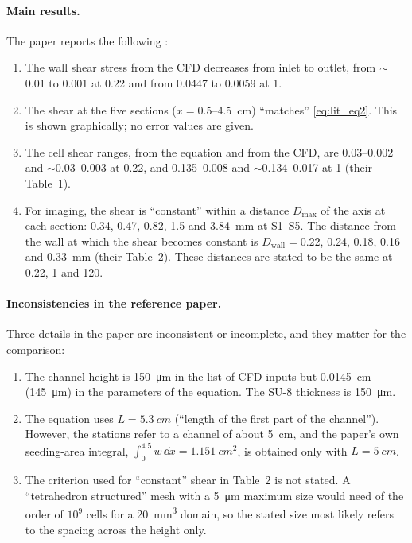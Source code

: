 \paragraph{Main results.} The paper reports the following \tagP:
\begin{enumerate}
\item The wall shear stress from the CFD decreases from inlet to outlet, from $\sim$\SI{0.01}{\dyncm} to \SI{0.001}{\dyncm} at \SI{0.22}{\uLmin} and from \SI{0.0447}{\dyncm} to \SI{0.0059}{\dyncm} at \SI{1}{\uLmin}.
\item The shear at the five sections ($x=0.5$--\SI{4.5}{cm}) ``matches'' \cref{eq:lit_eq2}. This is shown graphically; no error values are given.
\item The cell shear ranges, from the equation and from the CFD, are \SIrange{0.03}{0.002}{\dyncm} and $\sim$\SIrange{0.03}{0.003}{\dyncm} at \SI{0.22}{\uLmin}, and \SIrange{0.135}{0.008}{\dyncm} and $\sim$\SIrange{0.134}{0.017}{\dyncm} at \SI{1}{\uLmin} (their Table~1).
\item For imaging, the shear is ``constant'' within a distance $D_{\max}$ of the axis at each section: 0.34, 0.47, 0.82, 1.5 and \SI{3.84}{mm} at S1--S5. The distance from the wall at which the shear becomes constant is $D_{\mathrm{wall}}=0.22$, 0.24, 0.18, 0.16 and \SI{0.33}{mm} (their Table~2). These distances are stated to be the same at 0.22, 1 and \SI{120}{\uLmin}.
\end{enumerate}

\paragraph{Inconsistencies in the reference paper.} Three details in the paper are inconsistent or incomplete, and they matter for the comparison:
\begin{enumerate}[label=(\roman*)]
\item The channel height is \SI{150}{\micro\metre} in the list of CFD inputs but \SI{0.0145}{cm} (\SI{145}{\micro\metre}) in the parameters of the equation. The SU-8 thickness is \SI{150}{\micro\metre}.
\item The equation uses $L=\SI{5.3}{cm}$ (``length of the first part of the channel''). However, the stations refer to a channel of about \SI{5}{cm}, and the paper's own seeding-area integral, $\int_0^{4.5}w\,\dd x=\SI{1.151}{cm^2}$, is obtained only with $L=\SI{5}{cm}$.
\item The criterion used for ``constant'' shear in Table~2 is not stated. A ``tetrahedron structured'' mesh with a \SI{5}{\micro\metre} maximum size would need of the order of $10^9$ cells for a \SI{20}{\milli\metre\cubed} domain, so the stated size most likely refers to the spacing across the height only.
\end{enumerate}

